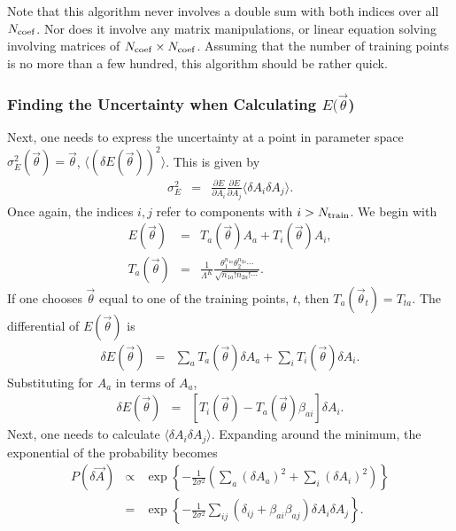 \documentclass[UserManual.tex]{subfiles}
\begin{document}
Note that this algorithm never involves a double sum with both indices over all $N_{\rm coef}$. Nor does it involve any matrix manipulations, or linear equation solving involving matrices of $N_{\rm coef}\times N_{\rm coef}$. Assuming that the number of training points is no more than a few hundred, this algorithm should be rather quick.

\subsubsection{Finding the Uncertainty when Calculating $E(\vec{\theta}$)}

Next, one needs to express the uncertainty at a point in parameter space $\sigma_E^2(\vec{\theta})=\vec{\theta}$, $\langle(\delta E(\vec{\theta}))^2\rangle$. This is given by 
\begin{eqnarray}
\sigma_E^2&=&\frac{\partial E}{\partial A_i}\frac{\partial E}{\partial A_j}\langle \delta A_i\delta A_j\rangle. 
\end{eqnarray}
Once again, the indices $i,j$ refer to components with $i>N_{\rm train}$. We begin with 
\begin{eqnarray}
E(\vec{\theta})&=&T_a(\vec{\theta})A_a+T_i(\vec{\theta})A_i,\\
\nonumber
T_a(\vec{\theta})&=&\frac{1}{\Lambda^K}\frac{\theta_1^{n_{1a}}\theta_2^{n_{2a}}\cdots}{\sqrt{n_{1a}!n_{2a}!\cdots}}.
\end{eqnarray}
If one chooses $\vec{\theta}$ equal to one of the training points, $t$, then $T_a(\vec{\theta}_t)=T_{ta}$. The differential of $E(\vec{\theta})$ is
\begin{eqnarray}
\delta E(\vec{\theta})&=&\sum_aT_a(\vec{\theta})\delta A_a+\sum_iT_i(\vec{\theta})\delta A_i.
\end{eqnarray}
Substituting for $A_a$ in terms of $A_a$, 
\begin{eqnarray}
\delta E(\vec{\theta})&=&\left[T_i(\vec{\theta})-T_a(\vec{\theta})\beta_{ai}\right]\delta A_i.
\end{eqnarray}
Next, one needs to calculate $\langle\delta A_i\delta A_j\rangle$. Expanding around the minimum, the exponential of the probability becomes
\begin{eqnarray}
P(\delta\vec{A})&\propto&
\exp\left\{
-\frac{1}{2\sigma^2}\left(\sum_a(\delta A_a)^2+\sum_i(\delta A_i)^2\right)
\right\}\\
\nonumber
&=&\exp\left\{
-\frac{1}{2\sigma^2}\sum_{ij}\left(\delta_{ij}+\beta_{ai}\beta_{aj}\right)\delta A_i\delta A_j
\right\}.
\end{eqnarray}
\end{document}
